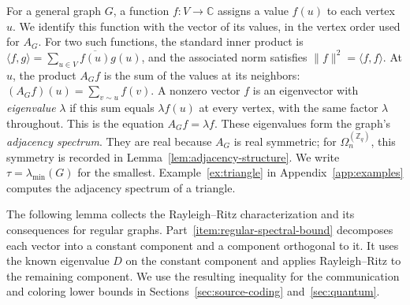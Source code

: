 \documentclass[11pt,a4paper]{article}
\numberwithin{equation}{section}
\numberwithin{figure}{section}
\numberwithin{table}{section}
\numberwithin{footnote}{section}
\theoremstyle{informal}\newtheorem*{informaltheorem}{Informal theorem}
\theoremstyle{definition}\newtheorem{example}{Example}[section]
\theoremstyle{remark}\newtheorem{remark}[theorem]{Remark}
\newcommand{\Z}{\mathbb Z}
\newcommand{\C}{\mathbb C}
\newcommand{\Om}{\Omega_n^{(\Z_q)}}
\begin{document}
For a general graph \(G\), a function \(f:V\to\C\) assigns a value
\(f(u)\) to each vertex \(u\). We identify this function with the vector of its values,
in the vertex order used for \(A_G\).
For two such functions, the standard inner product is
\(\langle f,g\rangle=\sum_{u\in V}\overline{f(u)}g(u)\),
and the associated norm satisfies \(\|f\|^2=\langle f,f\rangle\).
At \(u\), the product \(A_Gf\) is the sum of the values at its
neighbors: \((A_Gf)(u)=\sum_{v\sim u}f(v)\).
A nonzero vector \(f\) is an eigenvector with \emph{eigenvalue}
\(\lambda\) if this sum equals \(\lambda f(u)\) at every vertex,
with the same factor \(\lambda\) throughout. This is the equation
\(A_Gf=\lambda f\). These eigenvalues form the
graph's \emph{adjacency spectrum}. They are real because \(A_G\) is
real symmetric; for \(\Om\), this symmetry is recorded in
Lemma~\ref{lem:adjacency-structure}. We write
\(\tau=\lambda_{\min}(G)\) for the smallest. Example~\ref{ex:triangle} in Appendix~\ref{app:examples}
computes the adjacency spectrum of a triangle.

The following lemma collects the Rayleigh--Ritz characterization
and its consequences for regular graphs. Part~\ref{item:regular-spectral-bound}
decomposes each vector into a constant component and a component
orthogonal to it. It uses the known eigenvalue \(D\) on the constant
component and applies Rayleigh--Ritz to the remaining component.
We use the resulting inequality for the communication and coloring lower bounds in
Sections~\ref{sec:source-coding} and~\ref{sec:quantum}.
\end{document}
